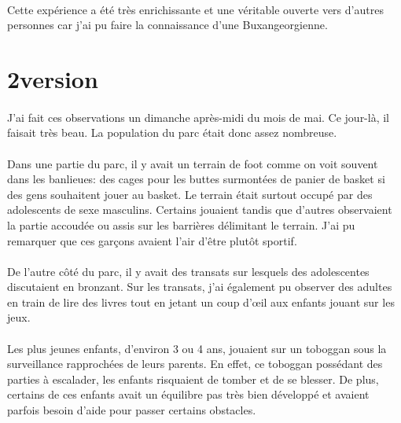 \paragraph{} Cette expérience a été très enrichissante et une véritable ouverte
vers d'autres personnes car j'ai pu faire la connaissance d'une
Buxangeorgienne.

\section{2\ieme version}

\paragraph{} J'ai fait ces observations un dimanche après-midi du mois de mai.
Ce jour-là, il faisait très beau. La population du parc était donc assez
nombreuse.

\paragraph{} Dans une partie du parc, il y avait un terrain de foot comme on
voit souvent dans les banlieues: des cages pour les buttes surmontées de panier
de basket si des gens souhaitent jouer au basket. Le terrain était surtout
occupé par des adolescents de sexe masculins. Certains jouaient tandis que
d'autres observaient la partie accoudée ou assis sur les barrières délimitant
le terrain. J'ai pu remarquer que ces garçons avaient l'air d'être plutôt
sportif.

\paragraph{} De l'autre côté du parc, il y avait des transats sur lesquels des
adolescentes discutaient en bronzant. Sur les transats, j'ai également pu
observer des adultes en train de lire des livres tout en jetant un coup d'œil
aux enfants jouant sur les jeux.

\paragraph{} Les plus jeunes enfants, d'environ 3 ou 4 ans, jouaient sur un
toboggan sous la surveillance rapprochées de leurs parents. En effet, ce
toboggan possédant des parties à escalader, les enfants risquaient de tomber et
de se blesser. De plus, certains de ces enfants avait un équilibre pas très
bien développé et avaient parfois besoin d'aide pour passer certains obstacles.

